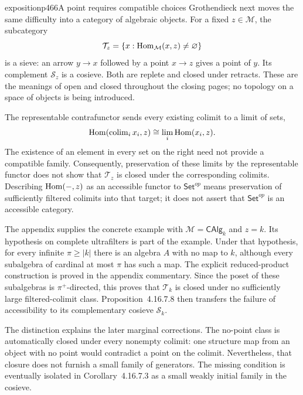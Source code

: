 \begin{dcomment}{exposition}{p466}{A point requires compatible choices}
Grothendieck next moves the same difficulty into a category of algebraic objects. For a fixed $z\in\mathcal M$, the subcategory
\[
 \mathcal T_z=\{x:\operatorname{Hom}_{\mathcal M}(x,z)\ne\varnothing\}
\]
is a sieve: an arrow $y\to x$ followed by a point $x\to z$ gives a point of $y$. Its complement $\mathcal S_z$ is a cosieve. Both are replete and closed under retracts. These are the meanings of open and closed throughout the closing pages; no topology on a space of objects is being introduced.

The representable contrafunctor sends every existing colimit to a limit of sets,
\[
 \operatorname{Hom}(\operatorname{colim}_i x_i,z)
 \cong\lim_i\operatorname{Hom}(x_i,z).
\]
The existence of an element in every set on the right need not provide a compatible family. Consequently, preservation of these limits by the representable functor does not show that $\mathcal T_z$ is closed under the corresponding colimits. Describing $\operatorname{Hom}(-,z)$ as an accessible functor to $\mathsf{Set}^{op}$ means preservation of sufficiently filtered colimits into that target; it does not assert that $\mathsf{Set}^{op}$ is an accessible category.

The appendix supplies the concrete example with $\mathcal M=\mathsf{CAlg}_k$ and $z=k$. Its hypothesis on complete ultrafilters is part of the example. Under that hypothesis, for every infinite $\pi\geq|k|$ there is an algebra $A$ with no map to $k$, although every subalgebra of cardinal at most $\pi$ has such a map. The explicit reduced-product construction is proved in the appendix commentary. Since the poset of these subalgebras is $\pi^+$-directed, this proves that $\mathcal T_k$ is closed under no sufficiently large filtered-colimit class. Proposition~4.16.7.8 then transfers the failure of accessibility to its complementary cosieve $\mathcal S_k$.

The distinction explains the later marginal corrections. The no-point class is automatically closed under every nonempty colimit: one structure map from an object with no point would contradict a point on the colimit. Nevertheless, that closure does not furnish a small family of generators. The missing condition is eventually isolated in Corollary~4.16.7.3 as a small weakly initial family in the cosieve.
\end{dcomment}



